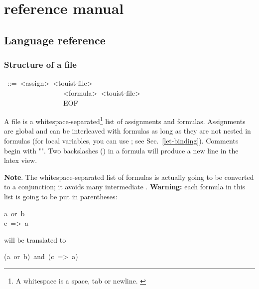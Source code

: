 \chapter{\touist{} reference manual}\label{chap:reference-manual}\label{sec-language-reference}%

\section{Language reference}

\subsection{Structure of a \touist file}\label{sec-structure-of-a-touist-file}%
\begin{mdpre}%
~::=~{\textless{}assign\textgreater{}}~{\textless{}touist-file\textgreater{}}\\
~~~~~~~~~~~~~~~~\textbar{}~{\textless{}formula\textgreater{}}~{\textless{}touist-file\textgreater{}}\\
~~~~~~~~~~~~~~~~\textbar{}~EOF%
\end{mdpre}\noindent A \touist file is a whitespace-separated\footnote{\noindent A whitespace is a space, tab or newline.%
\label{fn-whitespace}%
} list of
assignments and formulas. Assignments are global and can be interleaved
with formulas as long as they are not nested in formulas (for local
variables, you can use ; see Sec.~\ref{let-binding}). Comments begin
with "". Two backslashes (\mdcode{\textbackslash{}\textbackslash{}}) in a formula will produce a new
line in the latex view.

\noindent\textbf{Note}.
The whitespace-separated list of formulas is actually going to be
converted to a conjunction; it avoids many intermediate .
\textbf{Warning:} each formula in this list is going to be put in
parentheses:%
\begin{mdpre}%
\noindent a~or~b\\
c~=\textgreater{}~a%
\end{mdpre}\noindent will be translated to
\begin{mdpre}%
\noindent(a~or~b)~and~(c~=\textgreater{}~a)%
\end{mdpre}\label{newline-and-note}%

